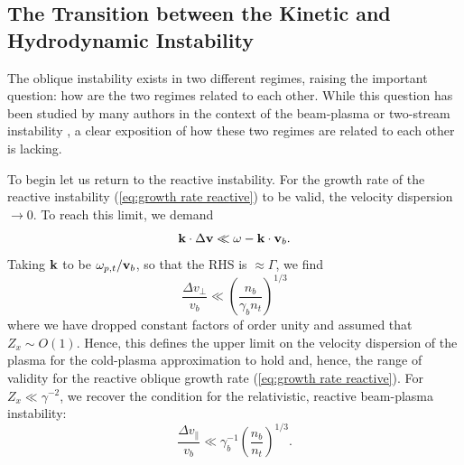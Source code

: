 \documentclass[usenatbib,iop,apj]{emulateapj}
\newcommand\bmath[1] {\mbox{\boldmath$\rm #1$}}
\newcommand{\vel}{\ensuremath{\bmath{v}}}
\newcommand{\kvec}{\ensuremath{\bmath{k}}}
\begin{document}
% 
% 

\subsection{The Transition between the Kinetic and Hydrodynamic Instability}\label{sec:transition}

The oblique instability exists in two different regimes, raising the important question: how are the two regimes related to each other. While this question has been studied by many authors in the context of the beam-plasma or two-stream instability \citep[see for instance][]{Melrose86,Boyd},  a clear exposition of how these two regimes are related to each other is lacking.  

To begin let us return to the reactive instability.  For the growth rate of the reactive instability (\ref{eq:growth rate reactive}) to be valid, the velocity dispersion $\rightarrow 0$.   To reach this limit, we demand
\begin{equation}
 \kvec\cdot\Delta \vel \ll \omega - \kvec\cdot\vel_b.
\end{equation}
Taking $\kvec$ to be $\omega_{p,t}/\vel_b$, so that the RHS is $\approx \Gamma$, we find
\begin{equation}\label{eq:oblique reactive regime}
 \frac{\Delta v_{\perp}}{v_b} \ll \left(\frac{n_b}{\gamma_b n_t}\right)^{1/3}
\end{equation}
where we have dropped constant factors of order unity and assumed that $Z_x \sim O(1)$.  Hence, this defines the upper limit on the velocity dispersion of the plasma for the cold-plasma approximation to hold and, hence, the range of validity for the reactive oblique growth rate (\ref{eq:growth rate reactive}).  For $Z_x \ll \gamma^{-2}$, we recover the condition for the relativistic, reactive beam-plasma instability:
\begin{equation}\label{eq:bp reactive regime}
\frac{\Delta v_{\parallel}}{v_b} \ll \gamma_b^{-1}\left(\frac{n_b}{n_t}\right)^{1/3}.
\end{equation}
\end{document}
